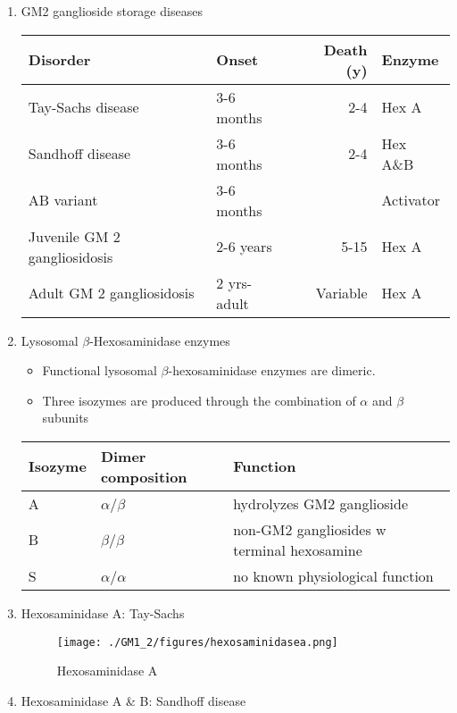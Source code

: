 \documentclass{scrartcl}
\begin{document}
\begin{enumerate}
\item GM2 ganglioside storage diseases
\label{sec:org6ac333e}

\begin{center}
\begin{tabular}{llrl}
Disorder & Onset & Death (y) & Enzyme\\
\hline
Tay-Sachs disease & 3-6 months & 2-4 & Hex A\\
Sandhoff disease & 3-6 months & 2-4 & Hex A\&B\\
AB variant & 3-6 months &  & Activator\\
Juvenile GM 2 gangliosidosis & 2-6 years & 5-15 & Hex A\\
Adult GM 2 gangliosidosis & 2 yrs-adult & Variable & Hex A\\
\end{tabular}
\end{center}


\item Lysosomal \(\beta\)-Hexosaminidase enzymes
\label{sec:org64bfa13}

\begin{itemize}
\item Functional lysosomal \(\beta\)-hexosaminidase enzymes are dimeric.
\item Three isozymes are produced through the combination of \(\alpha\)
and \(\beta\) subunits
\end{itemize}

\begin{center}
\begin{tabular}{lll}
Isozyme & Dimer composition & Function\\
\hline
A & \(\alpha\)/\(\beta\) & hydrolyzes GM2 ganglioside\\
B & \(\beta\)/\(\beta\) & non-GM2 gangliosides w terminal hexosamine\\
S & \(\alpha\)/\(\alpha\) & no known physiological function\\
\end{tabular}
\end{center}

\item Hexosaminidase A: Tay-Sachs
\label{sec:org5170f59}

\begin{figure}[htbp]
\centering
\texttt{[image: ./GM1\_2/figures/hexosaminidasea.png]}
\caption{\label{fig:org1c92027}
Hexosaminidase A}
\end{figure}


\item Hexosaminidase A \& B: Sandhoff disease
\label{sec:orgfae36a0}


\end{enumerate}
\end{document}
